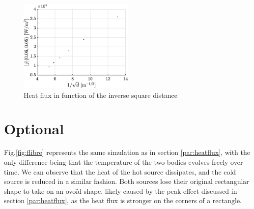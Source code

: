 \documentclass[a4paper,12pt,twoside]{article}
\begin{document}
\begin{figure}[h]
 \centering
 \includegraphics[width=0.5\textwidth]{graphs/e_distF2.eps}
 \caption{Heat flux in function of the inverse square distance}
 \label{fig:e-root}
\end{figure}


\section{Optional}
Fig.\ref{fig:flibre} represents the same simulation as in section \ref{par:heatflux}, with the only difference being that the temperature of the two bodies evolves freely over time. We can observe that the heat of the hot source dissipates, and the cold source is reduced in a similar fashion. Both sources lose their original rectangular shape to take on an ovoïd shape, likely caused by the peak effect discussed in section \ref{par:heatflux}, as the heat flux is stronger on the corners of a rectangle.
\end{document}
